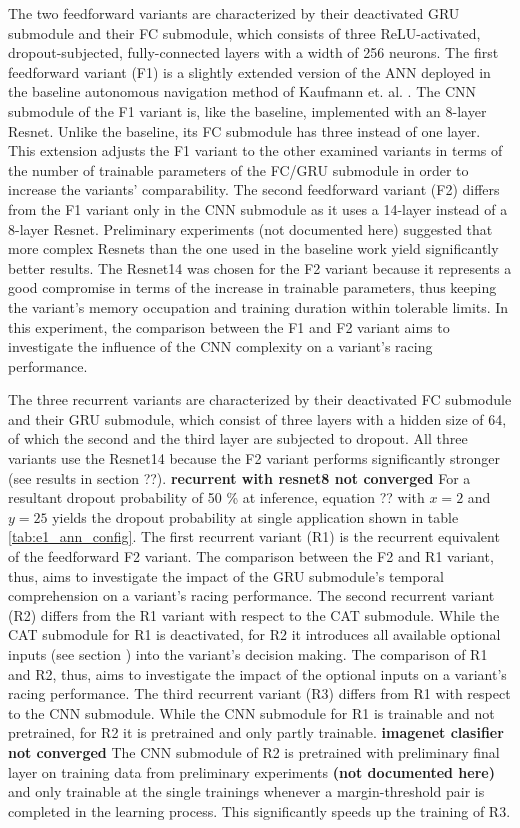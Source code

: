 The two feedforward variants 
are characterized by their
deactivated GRU submodule and their FC submodule,
which consists of three
ReLU-activated, dropout-subjected, fully-connected layers
with a width of 256 neurons.
The first feedforward variant (F1)
is a slightly extended version of the ANN 
deployed in the baseline autonomous navigation method 
of Kaufmann et. al. \cite{Kaufmann2018}.
The CNN submodule of the F1 variant is,
like the baseline, 
implemented with an 8-layer Resnet.
Unlike the baseline, its FC submodule 
has three instead of one layer.
This extension adjusts the F1 variant 
to the other examined variants in terms of
the number of trainable parameters of the FC/GRU submodule
in order to increase the variants' comparability.
The second feedforward variant (F2) differs from the F1 variant
only in the CNN submodule
as it uses a 14-layer instead of a 8-layer Resnet.
Preliminary experiments (not documented here)
suggested that more complex Resnets than the one used in the baseline work
yield significantly better results.
The Resnet14 was chosen for the F2 variant
because it represents a good compromise
in terms of the increase in trainable parameters,
thus keeping the variant's
memory occupation 
and training duration within tolerable limits.
In this experiment, 
the comparison between the F1 and F2 variant 
aims to investigate the influence of the CNN complexity 
on a variant's racing performance.


The three recurrent variants
are characterized by their deactivated FC submodule and 
their GRU submodule,
which consist of three layers
with a hidden size of 64,
of which the second and the third layer
are subjected to dropout.
All three variants use the Resnet14 
because the F2 variant performs significantly stronger
(see results in section ??).
\textbf{recurrent with resnet8 not converged}
For a resultant dropout probability of 50 \% at inference, 
equation ?? with $x=2$ and $y=25$ yields the dropout probability 
at single application shown in table \ref{tab:e1_ann_config}.
The first recurrent variant (R1)
is the recurrent equivalent of the feedforward F2 variant.
The comparison between the F2 and R1 variant, thus,
aims to investigate the impact of the GRU submodule's 
temporal comprehension
on a variant's racing performance.
The second recurrent variant (R2) differs 
from the R1 variant with respect to the CAT submodule.
While the CAT submodule for R1 is deactivated,
for R2 it introduces 
all available optional inputs (see section )
into the variant's decision making.
The comparison of R1 and R2, thus,
aims to investigate the impact of 
the optional inputs
on a variant's racing performance.
The third recurrent variant (R3) differs 
from R1 with respect to the CNN submodule.
While the CNN submodule for R1 is trainable and not pretrained,
for R2 it is pretrained and only partly trainable.
\textbf{imagenet clasifier not converged}
The CNN submodule of R2 is pretrained with preliminary final layer 
on training data from 
preliminary experiments \textbf{(not documented here)}
and only trainable at the single trainings
whenever a margin-threshold pair is completed in the learning process.
This significantly speeds up the training of R3.

